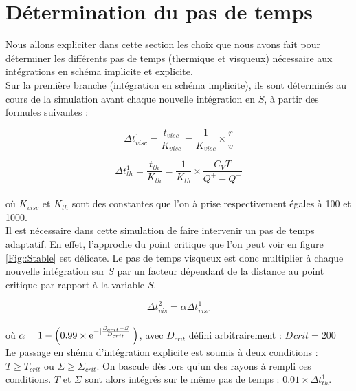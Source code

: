 \section{Détermination du pas de temps}
Nous allons expliciter dans cette section les choix que nous avons fait pour déterminer les différents pas de temps 	(thermique et visqueux) nécessaire aux intégrations en schéma implicite et explicite. \\


Sur la première branche (intégration en schéma implicite), ils sont déterminés au cours de la simulation avant chaque nouvelle intégration en $S$, à partir des formules suivantes : 

\begin{equation}
	\Delta t_{visc}^{1} = \frac{t_{visc}}{K_{visc}} = \frac{1}{K_{visc}} \times \frac{r}{v}
\end{equation}

\begin{equation}
	\Delta t_{th}^{1} = \frac{t_{th}}{K_{th}}= \frac{1}{K_{th}} \times \frac{C_{V} T}{Q^{+} - Q^{-}}
\end{equation} \\

où $K_{visc}$ et $K_{th}$ sont des constantes que l'on à prise respectivement égales à 100 et 1000. \\


Il est nécessaire dans cette simulation de faire intervenir un pas de temps adaptatif. En effet, l'approche du point critique que l'on peut voir en figure \ref{Fig::Stable} est délicate. Le pas de temps visqueux est donc multiplier
à chaque nouvelle intégration sur $S$ par un facteur dépendant de la distance au point critique par rapport à la variable $S$. 


\begin{equation}
	\Delta t_{vis}^{2} = \alpha \Delta t_{visc}^{1}
\end{equation} \\

où $\alpha = 1 - \left( 0.99 \times \e^{- \lvert \frac{S_{crit} - S}{D_{crit}} \rvert} \right)$, avec $D_{crit}$ défini arbitrairement : $D_{}crit = 200$ \\

Le passage en shéma d'intégration explicite est soumis à deux conditions : $T \ge T_{crit}$ ou $\Sigma \ge \Sigma_{crit}$. On bascule dès lors qu'un des rayons à rempli ces conditions. $T$ et $\Sigma$ sont alors intégrés sur le même pas de temps : $0.01 \times \Delta t_{th}^{1}$.

